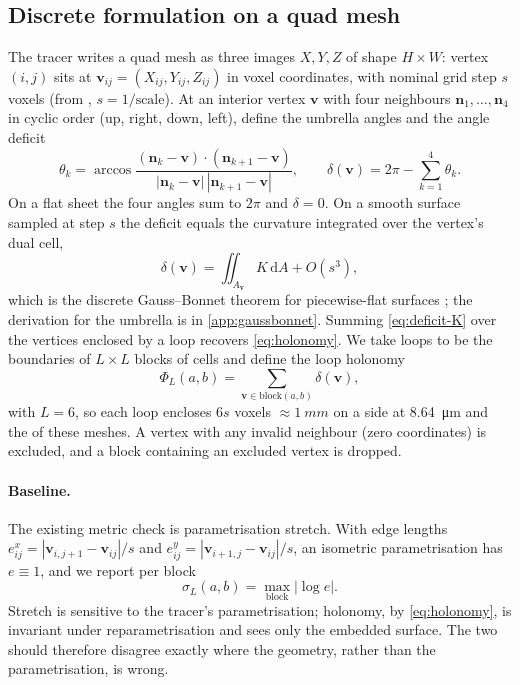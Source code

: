 \subsection{Discrete formulation on a quad mesh}
The tracer writes a quad mesh as three images $X,Y,Z$ of shape $H\times W$: vertex $(i,j)$ sits at $\mathbf{v}_{ij}=(X_{ij},Y_{ij},Z_{ij})$ in voxel coordinates, with nominal grid step $s$ voxels (from , $s=1/\text{scale}$). At an interior vertex $\mathbf{v}$ with four neighbours $\mathbf{n}_1,\dots,\mathbf{n}_4$ in cyclic order (up, right, down, left), define the umbrella angles and the angle deficit
\begin{equation}
\theta_k=\arccos\frac{(\mathbf{n}_k-\mathbf{v})\cdot(\mathbf{n}_{k+1}-\mathbf{v})}{|\mathbf{n}_k-\mathbf{v}|\,|\mathbf{n}_{k+1}-\mathbf{v}|},
\qquad
\delta(\mathbf{v})=2\pi-\sum_{k=1}^{4}\theta_k .
\label{eq:deficit}
\end{equation}
On a flat sheet the four angles sum to $2\pi$ and $\delta=0$. On a smooth surface sampled at step $s$ the deficit equals the curvature integrated over the vertex's dual cell,
\begin{equation}
\delta(\mathbf{v})=\iint_{A_{\mathbf{v}}}K\,\mathrm{d}A+O(s^{3}),
\label{eq:deficit-K}
\end{equation}
which is the discrete Gauss--Bonnet theorem for piecewise-flat surfaces \cite{meyer2003}; the derivation for the umbrella is in \cref{app:gaussbonnet}. Summing \cref{eq:deficit-K} over the vertices enclosed by a loop recovers \cref{eq:holonomy}. We take loops to be the boundaries of $L\times L$ blocks of cells and define the loop holonomy
\begin{equation}
\Phi_L(a,b)=\sum_{\mathbf{v}\in \text{block}(a,b)}\delta(\mathbf{v}),
\label{eq:loop}
\end{equation}
with $L=6$, so each loop encloses $6s$ voxels $\approx\SI{1}{mm}$ on a side at \SI{8.64}{\um} and the  of these meshes. A vertex with any invalid neighbour (zero coordinates) is excluded, and a block containing an excluded vertex is dropped.

\paragraph{Baseline.} The existing metric check is parametrisation stretch. With edge lengths $e^{x}_{ij}=|\mathbf{v}_{i,j+1}-\mathbf{v}_{ij}|/s$ and $e^{y}_{ij}=|\mathbf{v}_{i+1,j}-\mathbf{v}_{ij}|/s$, an isometric parametrisation has $e\equiv1$, and we report per block
\begin{equation}
\sigma_L(a,b)=\max_{\text{block}}\bigl|\log e\bigr| .
\label{eq:stretch}
\end{equation}
Stretch is sensitive to the tracer's parametrisation; holonomy, by \cref{eq:holonomy}, is invariant under reparametrisation and sees only the embedded surface. The two should therefore disagree exactly where the geometry, rather than the parametrisation, is wrong.

